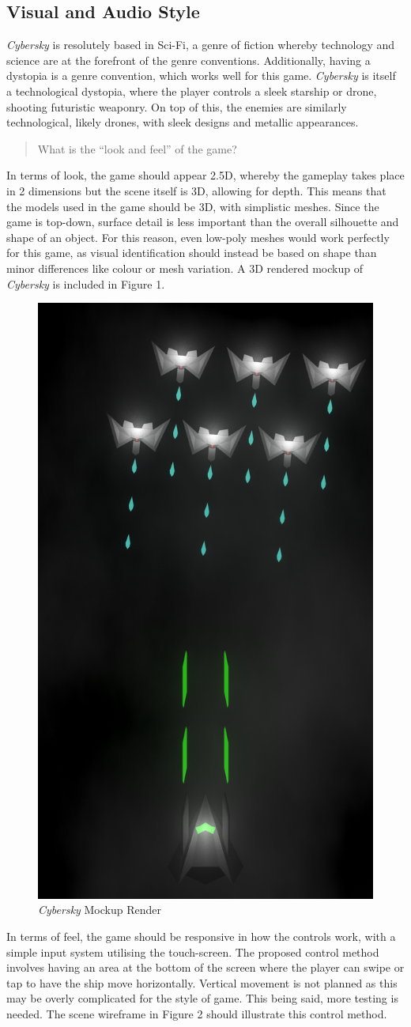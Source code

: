 \documentclass{scrartcl}
\begin{document}
\subsection{Visual and Audio Style}

\emph{Cybersky} is resolutely based in Sci-Fi, a genre of fiction whereby technology and science are at the forefront of the genre conventions. Additionally, having a dystopia is a genre convention, which works well for this game. \emph{Cybersky} is itself a technological dystopia, where the player controls a sleek starship or drone, shooting futuristic weaponry. On top of this, the enemies are similarly technological, likely drones, with sleek designs and metallic appearances.

\begin{quote}
  What is the “look and feel” of the game?
\end{quote}

In terms of look, the game should appear 2.5D, whereby the gameplay takes place in 2 dimensions but the scene itself is 3D, allowing for depth. This means that the models used in the game should be 3D, with simplistic meshes. Since the game is top-down, surface detail is less important than the overall silhouette and shape of an object. For this reason, even low-poly meshes would work perfectly for this game, as visual identification should instead be based on shape than minor differences like colour or mesh variation. A 3D rendered mockup of \emph{Cybersky} is included in Figure 1.

\begin{figure}[!h]
  \centering
  \includegraphics[width=.3\columnwidth]{mockup-01.png}
  \caption[\textit{Cybersky}]{\textit{Cybersky} Mockup Render}
\end{figure}

In terms of feel, the game should be responsive in how the controls work, with a simple input system utilising the touch-screen. The proposed control method involves having an area at the bottom of the screen where the player can swipe or tap to have the ship move horizontally. Vertical movement is not planned as this may be overly complicated for the style of game. This being said, more testing is needed. The scene wireframe in Figure 2 should illustrate this control method.
\end{document}
